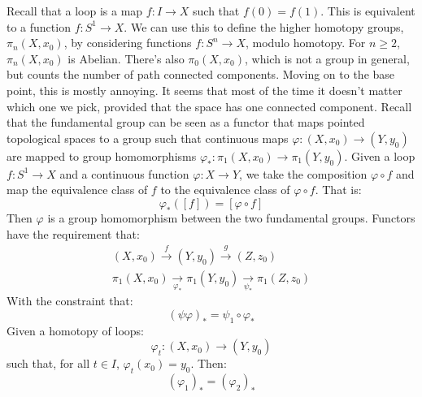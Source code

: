 \documentclass{book}                                                           %
\begin{document}
        Recall that a loop is a map $f:I\rightarrow{X}$
        such that $f(0)=f(1)$. This is equivalent to a
        function $f:S^{1}\rightarrow{X}$. We can use this to
        define the higher homotopy groups, $\pi_{n}(X,x_{0})$,
        by considering functions $f:S^{n}\rightarrow{X}$,
        modulo homotopy. For $n\geq{2}$,
        $\pi_{n}(X,x_{0})$ is Abelian. There's also
        $\pi_{0}(X,x_{0})$, which is not a group in general,
        but counts the number of path connected components.
        Moving on to the base point, this is mostly annoying.
        It seems that most of the time it doesn't matter which
        one we pick, provided that the space has one connected
        component. Recall that the fundamental group can be
        seen as a functor that maps pointed topological
        spaces to a group such that continuous maps
        $\varphi:(X,x_{0})\rightarrow(Y,y_{0})$ are mapped
        to group homomorphisms
        $\varphi_{*}:\pi_{1}(X,x_{0})\rightarrow\pi_{1}(Y,y_{0})$.
        Given a loop $f:S^{1}\rightarrow{X}$ and a continuous
        function $\varphi:X\rightarrow{Y}$, we take the
        composition $\varphi\circ{f}$ and map the equivalence
        class of $f$ to the equivalence class of
        $\varphi\circ{f}$. That is:
        \begin{equation}
            \varphi_{*}([f])=[\varphi\circ{f}]
        \end{equation}
        Then $\varphi$ is a group homomorphism between the
        two fundamental groups. Functors have the requirement
        that:
        \begin{align}
            (X,x_{0})\overset{f}{\longrightarrow}
            (Y,y_{0})\overset{g}{\longrightarrow}
            (Z,z_{0})\\
            \pi_{1}(X,x_{0})
                \underset{\varphi_{*}}{\longrightarrow}
            \pi_{1}(Y,y_{0})
                \underset{\psi_{*}}{\longrightarrow}
            \pi_{1}(Z,z_{0})
        \end{align}
        With the constraint that:
        \begin{equation}
            (\psi\varphi)_{*}=\psi_{1}\circ\varphi_{*}
        \end{equation}
        Given a homotopy of loops:
        \begin{equation}
            \varphi_{t}:(X,x_{0})\rightarrow(Y,y_{0})
        \end{equation}
        such that, for all $t\in{I}$, $\varphi_{t}(x_{0})=y_{0}$.
        Then:
        \begin{equation}
            (\varphi_{1})_{*}=(\varphi_{2})_{*}
        \end{equation}
\end{document}
